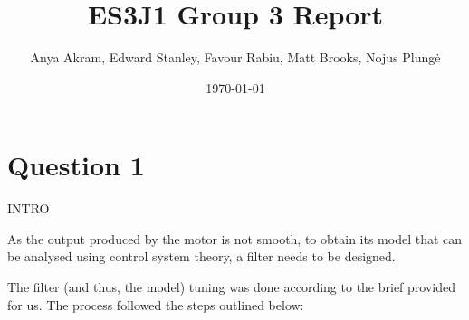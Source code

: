 \documentclass[11pt, onecolumn]{article}
\title{ES3J1 Group 3 Report}
\author{Anya Akram, Edward Stanley, Favour Rabiu, Matt Brooks, Nojus Plungė}
\date{\today}
\begin{document}
\maketitle

\section*{Question 1}
\par INTRO
\par As the output produced by the motor is not smooth, to obtain its model that can be analysed using control system theory, a filter needs to be designed.
\\\par The filter (and thus, the model) tuning was done according to the brief provided for us. The process followed the steps outlined below:
\end{document}
